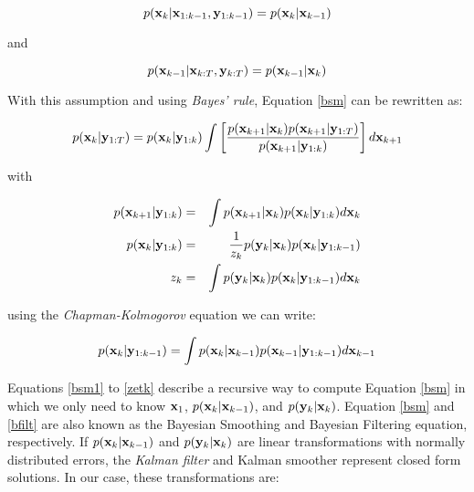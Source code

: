 \documentclass{bmc_template/bmcart}
\newcommand{\bm}[1]{{\bf #1}}
\begin{document}
\begin{equation}\label{markov1}
    p(\bm{x}_k|\bm{x}_{1:k-1}, \bm{y}_{1:k-1}) = p(\bm{x}_k|\bm{x}_{k-1})
\end{equation}

and

\begin{equation}\label{markov2}
    p(\bm{x}_{k-1}|\bm{x}_{k:T}, \bm{y}_{k:T}) = p(\bm{x}_{k-1}|\bm{x}_{k})
\end{equation}

With this assumption and using \textit{Bayes' rule}, Equation \ref{bsm} can be
rewritten as:

\begin{equation}\label{bsm1}
p(\bm{x}_k|\bm{y}_{1:T}) = p(\bm{x}_k|\bm{y}_{1:k})
    \int\left[\frac{p(\bm{x}_{k+1}|\bm{x}_k)p(\bm{x}_{k+1}|\bm{y}_{1:T})}{p(\bm{x}_{k+1}|\bm{y}_{1:k})}\right]d\bm{x}_{k+1}
\end{equation}

with

\begin{eqnarray}\label{bfilt1}
p(\bm{x}_{k+1}|\bm{y}_{1:k}) & = & \int p(\bm{x}_{k+1}|\bm{x}_k)p(\bm{x}_k|\bm{y}_{1:k})d\bm{x}_k \\
        \label{bfilt}
    p(\bm{x}_k|\bm{y}_{1:k}) & = & \frac{1}{z_k} p(\bm{y}_k|\bm{x}_k)p(\bm{x}_k|\bm{y}_{1:k-1}) \\
        \label{zetk}
    z_k & = & \int p(\bm{y}_k|\bm{x}_k) p(\bm{x}_k| \bm{y}_{1:k-1}) d\bm{x}_k  
\end{eqnarray}

using the \textit{Chapman-Kolmogorov} equation we can write:

\begin{equation}
p(\bm{x}_k|\bm{y}_{1:k-1}) = \int p(\bm{x}_k|\bm{x}_{k-1})p(\bm{x}_{k-1}|\bm{y}_{1:k-1})d\bm{x}_{k-1} 
\end{equation}

Equations \ref{bsm1} to \ref{zetk} describe a recursive way to compute Equation
\ref{bsm} in which we only need to know $\bm{x}_1$,
$p(\bm{x}_k|\bm{x}_{k-1})$, and $p(\bm{y}_k|\bm{x}_k)$. Equation \ref{bsm} and
\ref{bfilt} are also known as the Bayesian Smoothing and Bayesian Filtering
equation, respectively. If $p(\bm{x}_k|\bm{x}_{k-1})$ and
$p(\bm{y}_k|\bm{x}_k)$ are linear transformations with normally distributed
errors, the \textit{Kalman filter} \citep{Kalman1960} and Kalman smoother
\citep{Rauch1965} represent closed form solutions. In our case, these
transformations are:
\end{document}
